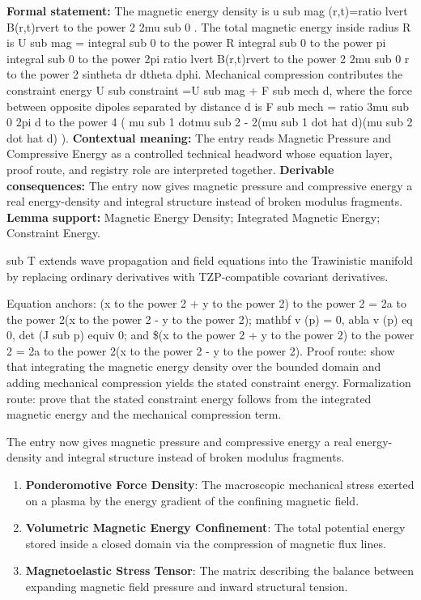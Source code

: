 \begingroup\footnotesize\setlength{\emergencystretch}{3em}\sloppy
\textbf{Formal statement:} The magnetic energy density is u sub mag (r,t)=ratio lvert B(r,t)rvert to the power 2 2mu sub 0 . The total magnetic energy inside radius R is U sub mag = integral sub 0 to the power R integral sub 0 to the power pi integral sub 0 to the power 2pi ratio lvert B(r,t)rvert to the power 2 2mu sub 0 r to the power 2 sintheta dr dtheta dphi. Mechanical compression contributes the constraint energy U sub constraint =U sub mag + F sub mech d, where the force between opposite dipoles separated by distance d is F sub mech = ratio 3mu sub 0 2pi d to the power 4 ( mu sub 1 dotmu sub 2 - 2(mu sub 1 dot hat d)(mu sub 2 dot hat d) ). \textbf{Contextual meaning:} The entry reads Magnetic Pressure and Compressive Energy as a controlled technical headword whose equation layer, proof route, and registry role are interpreted together. \textbf{Derivable consequences:} The entry now gives magnetic pressure and compressive energy a real energy-density and integral structure instead of broken modulus fragments. \textbf{Lemma support:} Magnetic Energy Density; Integrated Magnetic Energy; Constraint Energy.\par
\endgroup

sub T extends wave propagation and field equations into the Trawinistic manifold by replacing ordinary derivatives with TZP-compatible covariant derivatives.

Equation anchors: (x to the power 2 + y to the power 2) to the power 2 = 2a to the power 2(x to the power 2 - y to the power 2); mathbf v (p) = 0, abla v (p) eq 0, det (J sub p) equiv 0; and \$(x to the power 2 + y to the power 2) to the power 2 = 2a to the power 2(x to the power 2 - y to the power 2). Proof route: show that integrating the magnetic energy density over the bounded domain and adding mechanical compression yields the stated constraint energy. Formalization route: prove that the stated constraint energy follows from the integrated magnetic energy and the mechanical compression term.

The entry now gives magnetic pressure and compressive energy a real energy-density and integral structure instead of broken modulus fragments.
\endgroup

\begin{enumerate}[leftmargin=1.6em,itemsep=6pt,topsep=4pt]
\item \textbf{Ponderomotive Force Density}: The macroscopic mechanical stress exerted on a plasma by the energy gradient of the confining magnetic field.
\item \textbf{Volumetric Magnetic Energy Confinement}: The total potential energy stored inside a closed domain via the compression of magnetic flux lines.
\item \textbf{Magnetoelastic Stress Tensor}: The matrix describing the balance between expanding magnetic field pressure and inward structural tension.
\end{enumerate}

